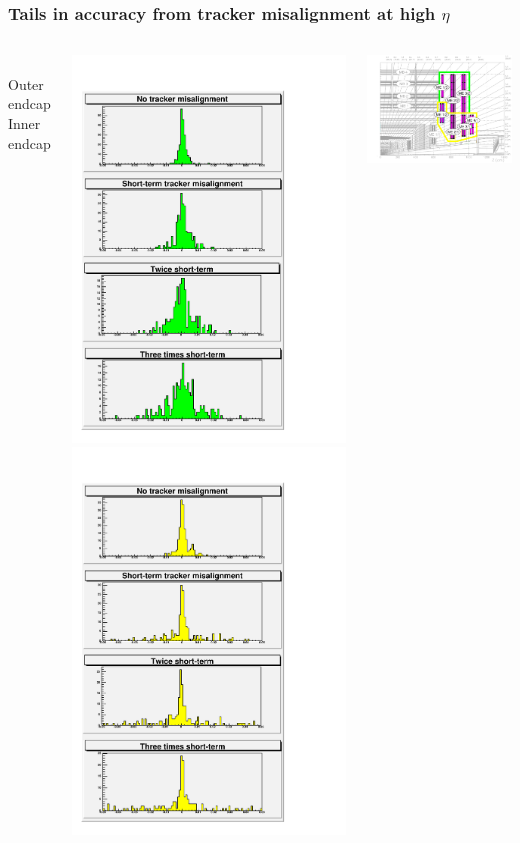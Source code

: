 \documentclass[compress]{beamer}
\begin{document}
\begin{frame}
\frametitle{Tails in accuracy from tracker misalignment at high $\eta$}
\begin{columns}
\mbox{ } \hfill Outer endcap \hfill \hfill Inner endcap \hfill \mbox{ }

\includegraphics[width=0.5\linewidth]{trackerdep_outer_endcap.pdf}
\includegraphics[width=0.5\linewidth]{trackerdep_inner_endcap.pdf}

\mbox{\hspace{-0.5 cm}} \includegraphics[width=\linewidth]{outer_inner_endcap.pdf}


\end{columns}
\end{frame}
\end{document}

